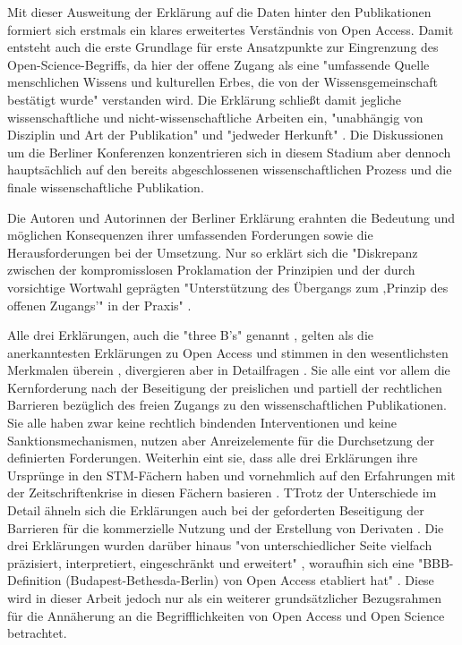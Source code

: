 \begin{enumerate}
Mit dieser Ausweitung der Erklärung auf die Daten hinter den Publikationen formiert sich erstmals ein klares erweitertes Verständnis von Open Access. Damit entsteht auch die erste Grundlage für erste Ansatzpunkte zur Eingrenzung des Open-Science-Begriffs, da hier der offene Zugang als eine "umfassende Quelle menschlichen Wissens und kulturellen Erbes, die von der Wissensgemeinschaft bestätigt wurde" \cite{berliner_erklaerung_2003} verstanden wird. Die Erklärung schließt damit jegliche wissenschaftliche und nicht-wissenschaftliche Arbeiten ein, "unabhängig von Disziplin und Art der Publikation" und "jedweder Herkunft" \cite{naeder_2010_open}. Die Diskussionen um die Berliner Konferenzen konzentrieren sich in diesem Stadium aber dennoch hauptsächlich auf den bereits abgeschlossenen wissenschaftlichen Prozess und die finale wissenschaftliche Publikation.

Die Autoren und Autorinnen der Berliner Erklärung erahnten die Bedeutung und möglichen Konsequenzen ihrer umfassenden Forderungen sowie die Herausforderungen bei der Umsetzung. Nur so erklärt sich die "Diskrepanz zwischen der kompromisslosen Proklamation der Prinzipien und der durch vorsichtige Wortwahl geprägten "Unterstützung des Übergangs zum ‚Prinzip des offenen Zugangs’" in der Praxis" \cite{Lossau_oa_2007}.
\end{enumerate}

Alle drei Erklärungen, auch die "three B's" genannt \cite{suber_2004_praising_oa}, gelten als die anerkanntesten Erklärungen zu Open Access und stimmen in den wesentlichsten Merkmalen überein \cite{albert_2006_open_implications}, divergieren aber in Detailfragen \cite{naeder_2010_open}. Sie alle eint vor allem die Kernforderung nach der Beseitigung der preislichen und partiell der rechtlichen Barrieren bezüglich des freien Zugangs zu den wissenschaftlichen Publikationen. Sie alle haben zwar keine rechtlich bindenden Interventionen und keine Sanktionsmechanismen, nutzen aber Anreizelemente für die Durchsetzung der definierten Forderungen. Weiterhin eint sie, dass alle drei Erklärungen ihre Ursprünge in den STM-Fächern haben und vornehmlich auf den Erfahrungen mit der Zeitschriftenkrise in diesen Fächern basieren \cite{naeder_2010_open}. TTrotz der Unterschiede im Detail ähneln sich die Erklärungen auch bei der geforderten Beseitigung der Barrieren für die kommerzielle Nutzung und der Erstellung von Derivaten \cite{CREATe_2014}. Die drei Erklärungen wurden darüber hinaus "von unterschiedlicher Seite vielfach präzisiert, interpretiert, eingeschränkt und erweitert" \cite{naeder_2010_open}, woraufhin sich eine "BBB-
Definition (Budapest-Bethesda-Berlin) von Open Access etabliert hat" \cite{Schirmbacher_oa_2007}. Diese wird in dieser Arbeit jedoch nur als ein weiterer grundsätzlicher Bezugsrahmen für die Annäherung an die Begrifflichkeiten von Open Access und Open Science betrachtet.

